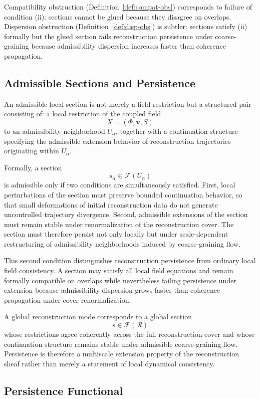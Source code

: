 \documentclass[11pt, a4paper]{article}
\theoremstyle{plain}
\theoremstyle{definition}
\theoremstyle{remark}
\newcommand{\sheaf}{\mathcal{F}}
\newcommand{\recon}{\mathcal{R}}
\begin{document}
Compatibility obstruction (Definition~\ref{def:compat-obs}) corresponds to failure
of condition (ii): sections cannot be glued because they disagree on overlaps.
Dispersion obstruction (Definition~\ref{def:disp-obs}) is subtler: sections satisfy
(ii) formally but the glued section fails reconstruction persistence under
coarse-graining because admissibility dispersion increases faster than coherence
propagation.

\subsection{Admissible Sections and Persistence}

An admissible local section is not merely a field restriction but a structured pair
consisting of: a local restriction of the coupled field
\[
  X = (\Phi,\mathbf{v},S)
\]
to an admissibility neighborhood $U_\alpha$, together with a continuation structure
specifying the admissible extension behavior of reconstruction trajectories
originating within $U_\alpha$.

Formally, a section
\[
  s_\alpha \in \sheaf(U_\alpha)
\]
is admissible only if two conditions are simultaneously satisfied.  First, local
perturbations of the section must preserve bounded continuation behavior, so that
small deformations of initial reconstruction data do not generate uncontrolled
trajectory divergence.  Second, admissible extensions of the section must remain
stable under renormalization of the reconstruction cover.  The section must therefore
persist not only locally but under scale-dependent restructuring of admissibility
neighborhoods induced by coarse-graining flow.

This second condition distinguishes reconstruction persistence from ordinary local
field consistency.  A section may satisfy all local field equations and remain
formally compatible on overlaps while nevertheless failing persistence under
extension because admissibility dispersion grows faster than coherence propagation
under cover renormalization.

A global reconstruction mode corresponds to a global section
\[
  s \in \sheaf(\recon)
\]
whose restrictions agree coherently across the full reconstruction cover and whose
continuation structure remains stable under admissible coarse-graining flow.
Persistence is therefore a multiscale extension property of the reconstruction
sheaf rather than merely a statement of local dynamical consistency.

\subsection{Persistence Functional}
\end{document}
